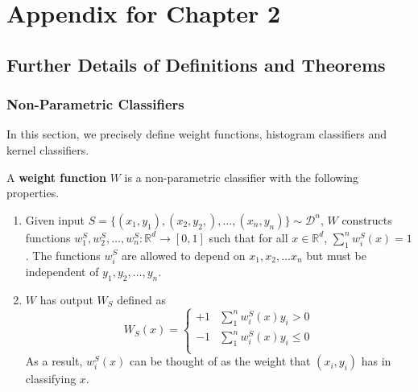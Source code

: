 \graphicspath{{./chapters/chapter1/}}

\def\supp{supp}
\def\D{{\mathcal D}}
\def\U{{\mathcal U}}
\def\V{{\mathcal V}}
\def\X{\mathcal X}
\def\R{\mathbb R}
\def\Y{\{\pm 1\}}
\def\d{\rho}
\def\E{\mathbb{E}}
\def\N{\mathbb{N}}
\def\g{g}
\def\A{\mathcal{A}}
\def\nat{g_{neighbor}}
\def\bad{\D_{1/2}^{-}}
\def\natural{neighborhood preserving}
\def\Natural{Neighborhood preserving}
\def\ncons{neighborhood}
\def\Ncons{Neighborhood}

\def\calD{\mathcal{D}}
\def\calU{\mathcal{U}}
\def\calV{\mathcal{V}}

\chapter{Appendix for Chapter 2}

\section{Further Details of Definitions and Theorems}

\subsection{Non-Parametric Classifiers}

In this section, we precisely define weight functions, histogram classifiers and kernel classifiers.

\begin{defn} \label{def:weight_chap_1} 
\cite{devroye96} A \textbf{weight function} $W$ is a non-parametric classifier with the following properties.
\begin{enumerate}
	\item Given input $S = \{(x_1, y_1), (x_2, y_2,), \dots, (x_n, y_n)\} \sim \D^n$, $W$ constructs functions $w_1^S, w_2^S, \dots, w_n^S: \R^d \to [0, 1]$ such that for all $x \in \R^d$, $\sum_1^n w_i^S(x) = 1$. The functions $w_i^S$ are allowed to depend on $x_1, x_2, \dots x_n$ but must be independent of $y_1, y_2, \dots, y_n$. 
	\item $W$ has output $W_S$ defined as \[ W_S(x) = \begin{cases} 
      +1 & \sum_1^n w_i^S(x)y_i > 0 \\
      -1 & \sum_1^n w_i^S(x)y_i \leq 0 \\
   \end{cases}
\]
As a result, $w_i^S(x)$ can be thought of as the weight that $(x_i, y_i)$ has in classifying $x$.
\end{enumerate}
\end{defn}

